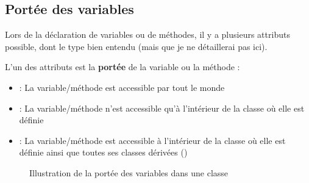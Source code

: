 \documentclass[a4paper,twoside]{article}
\begin{document}
\subsection{Portée des variables}
Lors de la déclaration de variables ou de méthodes, il y a plusieurs attributs possible, dont le type bien entendu (mais que je ne détaillerai pas ici). 

\bigskip

L'un des attributs est la \textbf{portée} de la variable ou la méthode :
\begin{itemize}
\item {} : La variable/méthode est accessible par tout le monde
\item {} : La variable/méthode n'est accessible qu'à l'intérieur de la classe où elle est définie
\item {} : La variable/méthode est accessible à l'intérieur de la classe où elle est définie ainsi que toutes ses classes dérivées ()
\end{itemize}

\begin{figure}[htb]
\centering
{}\hfill
{}\hfill
{}
\caption{Illustration de la portée des variables dans une classe}\label{fig:portee}
\end{figure}
\end{document}
